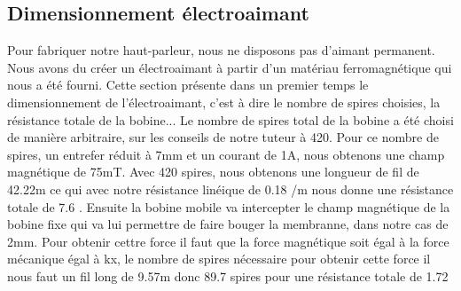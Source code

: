 \documentclass{article}
\begin{document}
\subsection{Dimensionnement électroaimant}
Pour fabriquer notre haut-parleur, nous ne disposons pas d'aimant permanent. Nous avons du créer un électroaimant à partir d'un
matériau ferromagnétique qui nous a été fourni. Cette section présente dans un premier temps le dimensionnement de l'électroaimant, c'est à dire le nombre 
de spires choisies, la résistance totale de la bobine...
Le nombre de spires total de la bobine a été choisi de manière arbitraire, sur les conseils de notre tuteur à 420. Pour ce nombre de spires, un entrefer 
réduit à 7mm et un courant de 1A, nous obtenons une champ magnétique de 75mT.
Avec 420 spires, nous obtenons une longueur de fil de 42.22m ce qui avec notre résistance linéique de 0.18 \Ohm /m nous donne une résistance totale de 7.6 \Ohm .
Ensuite la bobine mobile va intercepter le champ magnétique de la bobine fixe qui va lui permettre de faire bouger la membranne,
dans notre cas de 2mm. Pour obtenir cettre force il faut que la force magnétique soit égal à la force mécanique égal à kx, le nombre de spires nécessaire
pour obtenir cette force il nous faut un fil long de 9.57m donc 89.7 spires pour une résistance totale de 1.72 \Ohm
\end{document}
